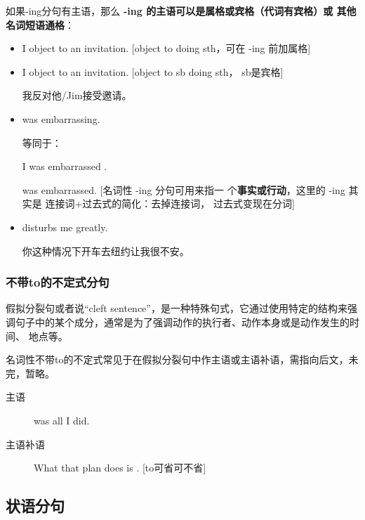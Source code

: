 如果-ing分句有主语，那么 \textbf{-ing 的主语可以是属格或宾格（代词有宾格）或
其他名词短语通格}：
\begin{itemize}
\item I object to  an invitation. [object to doing
  sth，可在 -ing 前加属格]
\item I object to  an invitation. [object to sb
  doing sth， sb是宾格]

  我反对他/Jim接受邀请。

\item {} was embarrassing.


  等同于：

  I was embarrassed .

   was embarrassed. [名词性 -ing 分句可用来指一
  个\textbf{事实或行动}，这里的 -ing 其实是 连接词+过去式的简化：去掉连接词，
  过去式变现在分词]

\item {} disturbs me greatly.

  你这种情况下开车去纽约让我很不安。

\end{itemize}

\subsubsection{不带to的不定式分句}

假拟分裂句或者说“cleft sentence”，是一种特殊句式，它通过使用特定的结构来强
调句子中的某个成分，通常是为了强调动作的执行者、动作本身或是动作发生的时间、
地点等。

名词性不带to的不定式常见于在假拟分裂句中作主语或主语补语，需指向后文，未完，暂略。
\begin{description}
\item[主语]  was all I did.
\item[主语补语] What that plan does is .
  [to可省可不省]
\end{description}



\subsection{状语分句}

